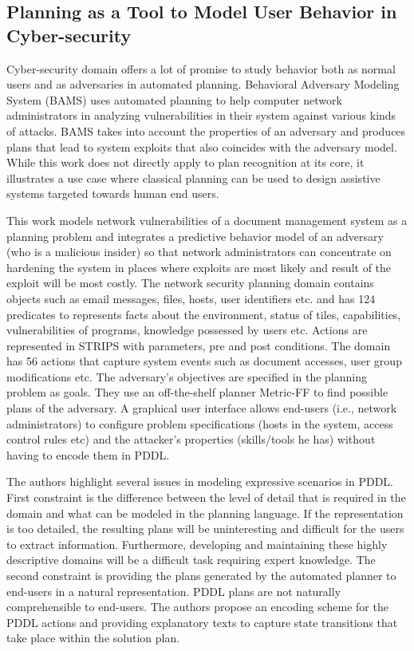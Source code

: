 \subsection{Planning as a Tool to Model User Behavior in Cyber-security}
Cyber-security domain offers a lot of promise to study behavior both as normal users and as adversaries in automated planning. Behavioral Adversary Modeling System (BAMS) \cite{boddy2005course} uses automated planning to help computer network administrators in analyzing vulnerabilities in their system against various kinds of attacks. BAMS takes into account the properties of an adversary and produces plans that lead to system exploits that also coincides with the adversary model. While this work does not directly apply to plan recognition at its core, it illustrates a use case where classical planning can be used to design assistive systems targeted towards human end users.

This work models network vulnerabilities of a document management system as a planning problem and integrates a predictive behavior model of an adversary (who is a malicious insider) so that network administrators can concentrate on hardening the system in places where exploits are most likely and result of the exploit will be most costly. The network security planning domain contains objects such as email messages, files, hosts, user identifiers etc. and has 124 predicates to represents facts about the environment, status of tiles, capabilities, vulnerabilities of programs, knowledge possessed by users etc. Actions are represented in STRIPS with parameters, pre and post conditions. The domain has 56 actions that capture system events such as document accesses, user group modifications etc. The adversary's objectives are specified in the planning problem as goals. They use an off-the-shelf planner Metric-FF \cite{hoffman2003ff} to find possible plans of the adversary. A graphical user interface allows end-users (i.e., network administrators) to configure problem specifications (hosts in the system, access control rules etc) and the attacker's properties (skills/tools he has) without having to encode them in PDDL.

The authors highlight several issues in modeling expressive scenarios in PDDL. First constraint is the difference between the level of detail that is required in the domain and what can be modeled in the planning language. If the representation is too detailed, the resulting plans will be uninteresting and difficult for the users to extract information. Furthermore, developing and maintaining these highly descriptive domains will be a difficult task requiring expert knowledge. The second constraint is providing the plans generated by the automated planner to end-users in a natural representation. PDDL plans are not naturally comprehensible to end-users. The authors propose an encoding scheme for the PDDL actions and providing explanatory texts to capture state transitions that take place within the solution plan.

